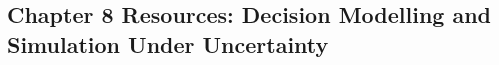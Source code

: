 \begin{refsection}
\chapter{Chapter 8 Resources: Decision Modelling and Simulation Under Uncertainty}
\label{chap:comp-ch08}



\printbibliography[heading=subbibliography,title={Chapter 8 References}]
\end{refsection}
